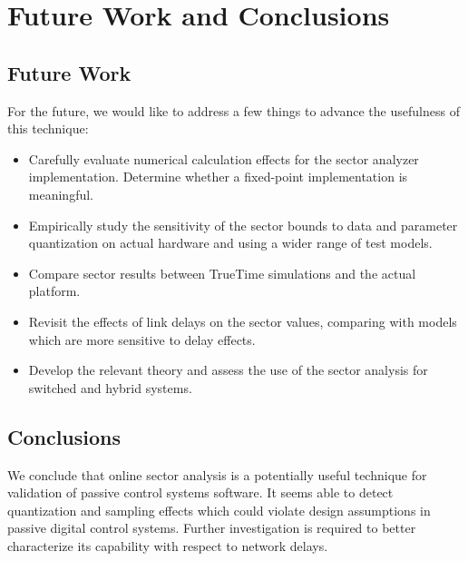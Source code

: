 \section{Future Work and Conclusions}
\label{section:conc}

\subsection{Future Work}

For the future, we would like to address a few things to advance the usefulness 
of this technique:

\begin{itemize}
 \item Carefully evaluate numerical calculation effects for the sector analyzer implementation. Determine whether a fixed-point implementation is meaningful.
 \item Empirically study the sensitivity of the sector bounds to data and parameter quantization on actual hardware and using a wider range of test models.
 \item Compare sector results between TrueTime simulations and the actual platform.
 \item Revisit the effects of link delays on the sector values, comparing with models which are more sensitive to delay effects.
 \item Develop the relevant theory and assess the use of the sector analysis for switched and hybrid systems.
\end{itemize}

\subsection{Conclusions}

We conclude that online sector analysis is a potentially useful technique for validation of 
passive control systems software.  It seems able to detect quantization and sampling effects
which could violate design assumptions in passive digital control systems. Further investigation 
is required to better characterize its capability with respect to network delays.

